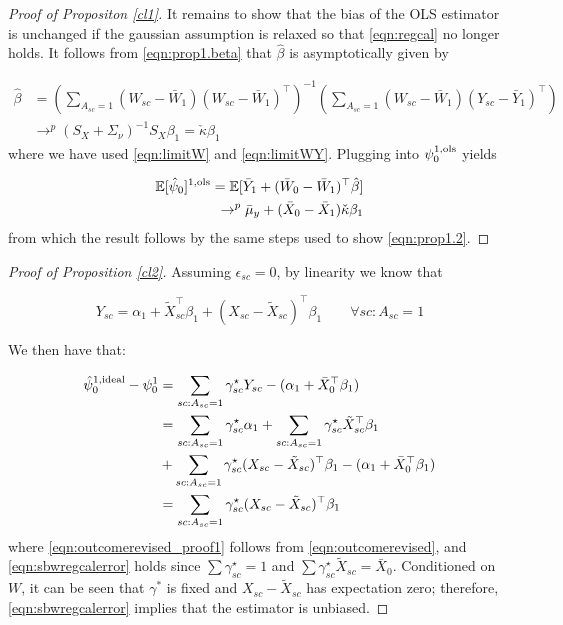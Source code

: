 \begin{proof}[Proof of Propositon \ref{cl1}]
It remains to show that the bias of the OLS estimator is unchanged if the gaussian assumption is relaxed so that \eqref{eqn:regcal} no longer holds. It follows from \eqref{eqn:prop1.beta} that $\hat{\beta}$ is asymptotically given by

    \begin{align*}
    \hat{\beta} &= \left(\sum_{A_{sc}=1} (W_{sc} - \bar{W}_1)(W_{sc} - \bar{W}_1)^\top \right)^{-1} \left(\sum_{A_{sc}=1} (W_{sc} - \bar{W}_1)(Y_{sc} - \bar{Y}_1)^\top\right) \\
     & \rightarrow^p  (S_X + \Sigma_\nu)^{-1}S_X \beta_1 = \check{\kappa} \beta_1
    \end{align*}
where we have used \eqref{eqn:limitW} and \eqref{eqn:limitWY}. Plugging into $\psi_0^{1,\textup{ols}}$ yields

\begin{align*}    
    \mathbb{E}[\hat{\psi}_0]^{1,\textup{ols}} = \mathbb{E}[ \bar{Y}_1 + (\bar{W}_0 - \bar{W}_1)^\top \hat{\beta}] \\
    \rightarrow^p  \bar{\mu}_y + (\bar{X}_0 - \bar{X}_1)\check{\kappa} \beta_1
\end{align*}
from which the result follows by the same steps used to show \eqref{eqn:prop1.2}.

\end{proof}

\begin{proof}[Proof of Proposition \ref{cl2}]
Assuming $\epsilon_{sc} = 0$, by linearity we know that

\begin{equation}\label{eqn:outcomerevised}
Y_{sc} = \alpha_1 + \tilde{X}_{sc}^\top\beta_1 + (X_{sc} - \tilde{X}_{sc})^\top\beta_1 \qquad \forall sc: A_{sc} = 1
\end{equation}

We then have that:

\begin{align}\nonumber
    \hat{\psi}_0^{1,\textup{ideal}} - \psi_0^1 &= \sum_{sc: A_{sc} = 1}\gamma_{sc}^\star Y_{sc} - (\alpha_1 + \bar{X}_0^\top\beta_1) \\
    \nonumber &= \sum_{sc: A_{sc} = 1}\gamma_{sc}^\star\alpha_1 + \sum_{sc: A_{sc} = 1}\gamma_{sc}^\star\tilde{X}_{sc}^\top\beta_1 \\ 
    &+ \sum_{sc: A_{sc} = 1}\gamma_{sc}^\star(X_{sc} - \tilde{X}_{sc})^\top\beta_1 - (\alpha_1 + \bar{X}_0^\top\beta_1) \label{eqn:outcomerevised_proof1}\\
    &= \sum_{sc: A_{sc} = 1}\gamma_{sc}^\star(X_{sc} - \tilde{X}_{sc})^\top\beta_1\label{eqn:sbwregcalerror}
\end{align}
where \eqref{eqn:outcomerevised_proof1} follows from \eqref{eqn:outcomerevised}, and \eqref{eqn:sbwregcalerror} holds since $\sum \gamma_{sc}^\star = 1$ and $\sum \gamma_{sc}^\star \tilde{X}_{sc} = \bar{X}_0$. Conditioned on $W$, it can be seen that $\gamma^*$ is fixed and $X_{sc} - \tilde{X}_{sc}$ has expectation zero; therefore, \eqref{eqn:sbwregcalerror} implies that the estimator is unbiased.
\end{proof}

